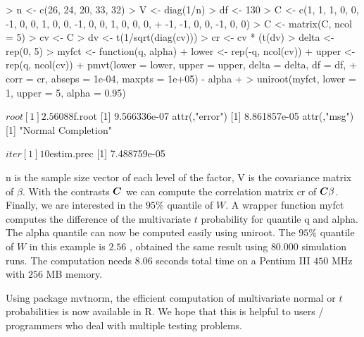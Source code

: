 \documentclass[11pt]{amsart}
\newcommand{\C}{\mbox{\boldmath $C$}}
\begin{document}
\begin{Schunk}
\begin{Sinput}
> n <- c(26, 24, 20, 33, 32)
> V <- diag(1/n)
> df <- 130
> C <- c(1, 1, 1, 0, 0, -1, 0, 0, 1, 0, 0, -1, 0, 0, 1, 0, 0, 0, 
+     -1, -1, 0, 0, -1, 0, 0)
> C <- matrix(C, ncol = 5)
> cv <- C %*% V %*% t(C)
> dv <- t(1/sqrt(diag(cv)))
> cr <- cv * (t(dv) %*% dv)
> delta <- rep(0, 5)
> myfct <- function(q, alpha) {
+     lower <- rep(-q, ncol(cv))
+     upper <- rep(q, ncol(cv))
+     pmvt(lower = lower, upper = upper, delta = delta, df = df, 
+         corr = cr, abseps = 1e-04, maxpts = 1e+05) - alpha
+ }
> uniroot(myfct, lower = 1, upper = 5, alpha = 0.95)
\end{Sinput}
\begin{Soutput}
$root
[1] 2.56088

$f.root
[1] 9.566336e-07
attr(,"error")
[1] 8.861857e-05
attr(,"msg")
[1] "Normal Completion"

$iter
[1] 10

$estim.prec
[1] 7.488759e-05
\end{Soutput}
\end{Schunk}
{\ttfamily n} is the sample size vector of each level of the
factor, {\ttfamily V} is the covariance matrix of $ \beta $. With
the contrasts $ \C $ we can compute the correlation matrix
{\ttfamily cr} of $ \C\beta $. Finally, we are interested in the
$ 95\%$ quantile of $ W $. A wrapper function {\ttfamily myfct}
computes the difference of the multivariate $ t $ probability for
quantile {\ttfamily q} and {\ttfamily alpha}. The {\ttfamily
alpha} quantile can now be computed easily using {\ttfamily
uniroot}. The $95\%$ quantile of $ W $ in this example is $ 2.56 $
, \cite{the-effici:1987} obtained the same result using $ 80.000
$ simulation runs. The computation needs $ 8.06 $ seconds total
time on a Pentium III $450$ MHz with $256$ MB memory.

Using package {\ttfamily mvtnorm}, the efficient computation of
multivariate normal or $ t $ probabilities is now available
in {\ttfamily R}. We hope that this is helpful to users / programmers who
deal with multiple testing problems.



\end{document}
